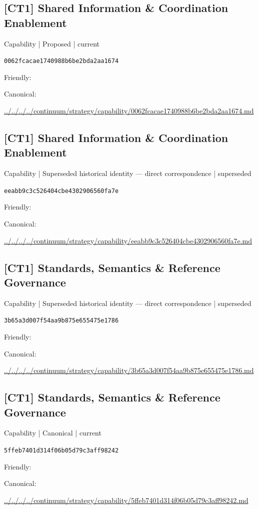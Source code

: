 \documentclass[10pt,a4paper]{article}
\begin{document}
\subsection*{[CT1] Shared Information \& Coordination Enablement}
{\small Capability | Proposed | current}\par
\texttt{0062fcacae1740988b6be2bda2aa1674}\par
Friendly: \par
Canonical: \par
{\footnotesize\url{../../../../continuum/strategy/capability/0062fcacae1740988b6be2bda2aa1674.md}}\par
\subsection*{[CT1] Shared Information \& Coordination Enablement}
{\small Capability | Superseded historical identity — direct correspondence | superseded}\par
\texttt{eeabb9c3c526404cbe4302906560fa7e}\par
Friendly: \par
Canonical: \par
{\footnotesize\url{../../../../continuum/strategy/capability/eeabb9c3c526404cbe4302906560fa7e.md}}\par
\subsection*{[CT1] Standards, Semantics \& Reference Governance}
{\small Capability | Superseded historical identity — direct correspondence | superseded}\par
\texttt{3b65a3d007f54aa9b875e655475e1786}\par
Friendly: \par
Canonical: \par
{\footnotesize\url{../../../../continuum/strategy/capability/3b65a3d007f54aa9b875e655475e1786.md}}\par
\subsection*{[CT1] Standards, Semantics \& Reference Governance}
{\small Capability | Canonical | current}\par
\texttt{5ffeb7401d314f06b05d79c3aff98242}\par
Friendly: \par
Canonical: \par
{\footnotesize\url{../../../../continuum/strategy/capability/5ffeb7401d314f06b05d79c3aff98242.md}}\par
\end{document}
